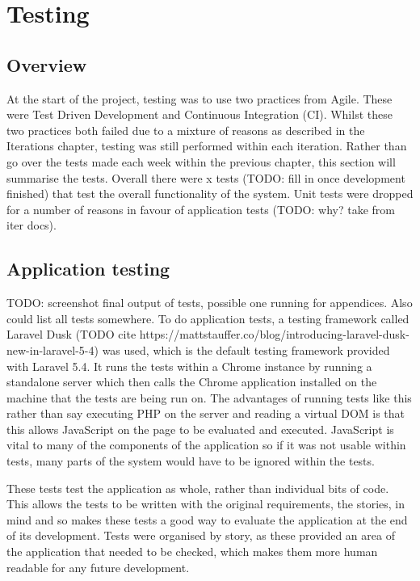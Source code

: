 \chapter{Testing}

\section{Overview}
At the start of the project, testing was to use two practices from Agile. These were Test Driven Development and Continuous Integration (CI). Whilst these two practices both failed due to a mixture of reasons as described in the Iterations chapter, testing was still performed within each iteration. Rather than go over the tests made each week within the previous chapter, this section will summarise the tests. Overall there were x tests (TODO: fill in once development finished) that test the overall functionality of the system. Unit tests were dropped for a number of reasons in favour of application tests (TODO: why? take from iter docs).

\section{Application testing}
TODO: screenshot final output of tests, possible one running for appendices. Also could list all tests somewhere.
To do application tests, a testing framework called Laravel Dusk (TODO cite https://mattstauffer.co/blog/introducing-laravel-dusk-new-in-laravel-5-4) was used, which is the default testing framework provided with Laravel 5.4. It runs the tests within a Chrome instance by running a standalone server which then calls the Chrome application installed on the machine that the tests are being run on. The advantages of running tests like this rather than say executing PHP on the server and reading a virtual DOM is that this allows JavaScript on the page to be evaluated and executed. JavaScript is vital to many of the components of the application so if it was not usable within tests, many parts of the system would have to be ignored within the tests.

These tests test the application as whole, rather than individual bits of code. This allows the tests to be written with the original requirements, the stories, in mind and so makes these tests a good way to evaluate the application at the end of its development. Tests were organised by story, as these provided an area of the application that needed to be checked, which makes them more human readable for any future development.


